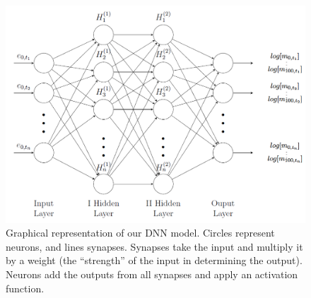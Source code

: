 \documentclass[a4,11pt]{article}
\begin{document}
\begin{figure}[H]
\centering
\includegraphics[width=0.8\linewidth]{NNmodel.png}
\caption{\footnotesize Graphical representation of our DNN model. Circles represent neurons, and lines synapses. Synapses take the input and multiply it by a weight (the “strength” of the input in determining the output). Neurons add the outputs from all synapses and apply an activation function.}
\label{fig:NN}
\end{figure}
\end{document}
